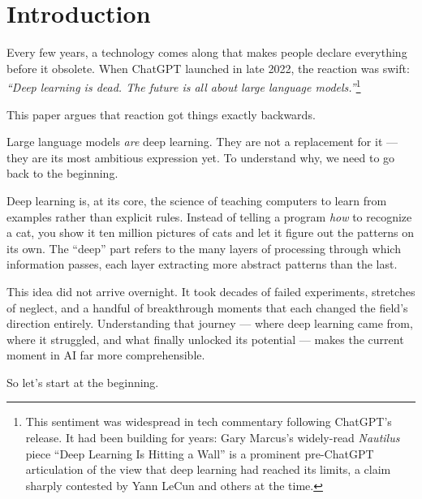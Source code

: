 \section{Introduction}

Every few years, a technology comes along that makes people declare everything before it obsolete.
When ChatGPT launched in late 2022, the reaction was swift: \emph{``Deep learning is dead. The future is all about large language models.''}\footnote{This sentiment was widespread in tech commentary following ChatGPT's release. It had been building for years: Gary Marcus's widely-read \emph{Nautilus} piece ``Deep Learning Is Hitting a Wall'' \cite{marcus2022wall} is a prominent pre-ChatGPT articulation of the view that deep learning had reached its limits, a claim sharply contested by Yann LeCun and others at the time.}

This paper argues that reaction got things exactly backwards.

Large language models \emph{are} deep learning.
They are not a replacement for it --- they are its most ambitious expression yet.
To understand why, we need to go back to the beginning.

Deep learning is, at its core, the science of teaching computers to learn from examples rather than explicit rules.
Instead of telling a program \emph{how} to recognize a cat, you show it ten million pictures of cats and let it figure out the patterns on its own.
The ``deep'' part refers to the many layers of processing through which information passes, each layer extracting more abstract patterns than the last.

This idea did not arrive overnight.
It took decades of failed experiments, stretches of neglect, and a handful of breakthrough moments that each changed the field's direction entirely.
Understanding that journey --- where deep learning came from, where it struggled, and what finally unlocked its potential --- makes the current moment in AI far more comprehensible.

So let's start at the beginning.
